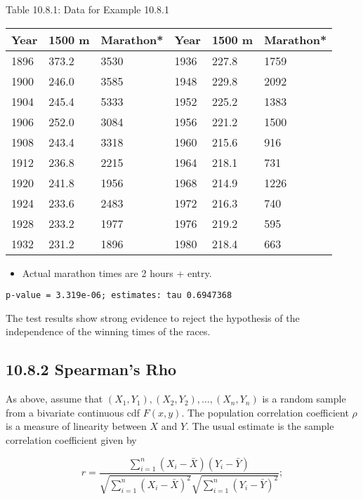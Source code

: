 Table 10.8.1: Data for Example 10.8.1

\begin{center}
\begin{tabular}{|l|l|l|l|l|l|}
\hline
Year & 1500 m & Marathon* & Year & 1500 m & Marathon* \\
\hline
1896 & 373.2 & 3530 & 1936 & 227.8 & 1759 \\
\hline
1900 & 246.0 & 3585 & 1948 & 229.8 & 2092 \\
\hline
1904 & 245.4 & 5333 & 1952 & 225.2 & 1383 \\
\hline
1906 & 252.0 & 3084 & 1956 & 221.2 & 1500 \\
\hline
1908 & 243.4 & 3318 & 1960 & 215.6 & 916 \\
\hline
1912 & 236.8 & 2215 & 1964 & 218.1 & 731 \\
\hline
1920 & 241.8 & 1956 & 1968 & 214.9 & 1226 \\
\hline
1924 & 233.6 & 2483 & 1972 & 216.3 & 740 \\
\hline
1928 & 233.2 & 1977 & 1976 & 219.2 & 595 \\
\hline
1932 & 231.2 & 1896 & 1980 & 218.4 & 663 \\
\hline
\end{tabular}
\end{center}

\begin{itemize}
  \item Actual marathon times are 2 hours + entry.
\end{itemize}

\begin{verbatim}
p-value = 3.319e-06; estimates: tau 0.6947368
\end{verbatim}

The test results show strong evidence to reject the hypothesis of the independence of the winning times of the races.

\subsection*{10.8.2 Spearman's Rho}
As above, assume that $\left(X_{1}, Y_{1}\right),\left(X_{2}, Y_{2}\right), \ldots,\left(X_{n}, Y_{n}\right)$ is a random sample from a bivariate continuous cdf $F(x, y)$. The population correlation coefficient $\rho$ is a measure of linearity between $X$ and $Y$. The usual estimate is the sample correlation coefficient given by


\begin{equation*}
r=\frac{\sum_{i=1}^{n}\left(X_{i}-\bar{X}\right)\left(Y_{i}-\bar{Y}\right)}{\sqrt{\sum_{i=1}^{n}\left(X_{i}-\bar{X}\right)^{2}} \sqrt{\sum_{i=1}^{n}\left(Y_{i}-\bar{Y}\right)^{2}}} ; \tag{10.8.9}
\end{equation*}



